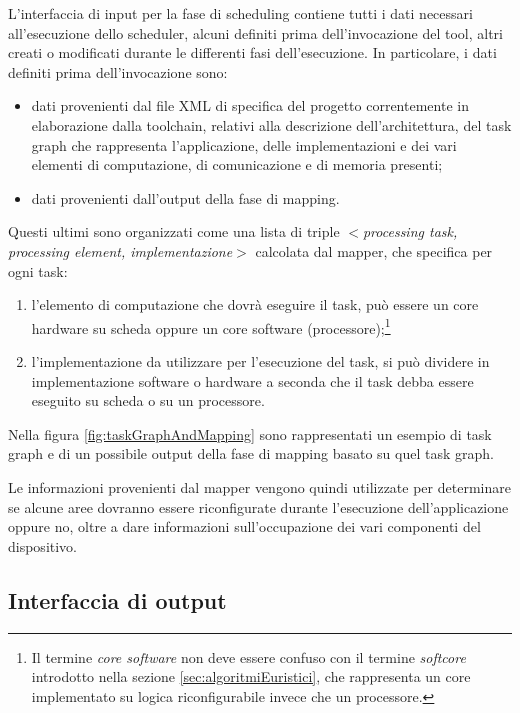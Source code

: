 L'interfaccia di input per la fase di scheduling contiene tutti i dati 
necessari all'esecuzione dello scheduler, alcuni definiti prima 
dell'invocazione del tool, altri creati o modificati durante le differenti fasi 
dell'esecuzione. In particolare, i dati definiti prima dell'invocazione sono:
\begin{itemize}
 \item dati provenienti dal file XML di specifica del progetto correntemente in 
elaborazione dalla toolchain, relativi alla descrizione dell'architettura, del 
task graph che rappresenta l'applicazione, delle implementazioni e dei vari elementi 
di computazione, di 
comunicazione e di memoria presenti;
 \item dati provenienti dall'output della fase di mapping.
\end{itemize}
Questi ultimi sono organizzati come una lista di triple \emph{$<$processing 
task, processing element, implementazione$>$} calcolata dal mapper, che 
specifica per ogni task:
\begin{enumerate}
 \item l'elemento di computazione che dovrà eseguire il task, può essere un 
core hardware su scheda oppure un core software (processore);\footnote{Il termine
\emph{core software} non deve essere confuso con il termine \emph{softcore} introdotto
nella sezione \ref{sec:algoritmiEuristici}, che rappresenta un core implementato su
logica riconfigurabile invece che un processore.}
 \item l'implementazione da utilizzare per l'esecuzione del task, si può 
dividere in implementazione software o hardware a seconda che il task debba 
essere eseguito su scheda o su un processore.
\end{enumerate}
Nella figura \ref{fig:taskGraphAndMapping} sono rappresentati un esempio di 
task graph e di un possibile output della fase di mapping basato su quel task graph.

Le informazioni provenienti dal mapper vengono quindi utilizzate per 
determinare se alcune aree dovranno essere riconfigurate durante l'esecuzione 
dell'applicazione oppure no, oltre a dare informazioni sull'occupazione dei 
vari componenti del dispositivo.


\subsection{Interfaccia di output}

